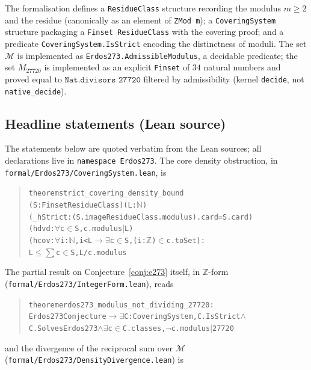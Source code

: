 \documentclass[11pt,a4paper]{article}
\theoremstyle{plain}
\theoremstyle{definition}
\theoremstyle{remark}
\begin{document}
The formalisation defines a \texttt{ResidueClass} structure
recording the modulus $m \geq 2$ and the residue (canonically as an
element of \texttt{ZMod m}); a \texttt{CoveringSystem} structure
packaging a \texttt{Finset ResidueClass} with the covering proof;
and a predicate \texttt{CoveringSystem.IsStrict} encoding the
distinctness of moduli. The set
$\mathcal{M}$ is implemented as \texttt{Erdos273.AdmissibleModulus},
a decidable predicate; the set $M_{27720}$ is implemented as an
explicit \texttt{Finset} of $34$ natural numbers and proved equal to
$\texttt{Nat.divisors 27720}$ filtered by admissibility (kernel
\texttt{decide}, not \texttt{native\_decide}).

\subsection*{Headline statements (Lean source)}

The statements below are quoted verbatim from the Lean sources; all
declarations live in \texttt{namespace Erdos273}. The core density
obstruction, in \texttt{formal/Erdos273/CoveringSystem.lean}, is

\begin{quote}
\begin{alltt}\small
theorem strict_covering_density_bound
    (S : Finset ResidueClass) (L : \(\mathbb{N}\))
    (_hStrict : (S.image ResidueClass.modulus).card = S.card)
    (hdvd : \(\forall\) c \(\in\) S, c.modulus \(\mid\) L)
    (hcov : \(\forall\) i : \(\mathbb{N}\), i < L \(\to\) \(\exists\) c \(\in\) S, (i : \(\mathbb{Z}\)) \(\in\) c.toSet) :
    L \(\leq\) \(\sum\) c \(\in\) S, L / c.modulus
\end{alltt}
\end{quote}

\noindent The partial result on Conjecture~\ref{conj:e273} itself, in
$\mathbb{Z}$-form (\texttt{formal/Erdos273/IntegerForm.lean}), reads

\begin{quote}
\begin{alltt}\small
theorem erdos273_modulus_not_dividing_27720 :
    Erdos273Conjecture \(\to\) \(\exists\) C : CoveringSystem, C.IsStrict \(\wedge\)
        C.SolvesErdos273 \(\wedge\) \(\exists\) c \(\in\) C.classes, \(\lnot\) c.modulus \(\mid\) 27720
\end{alltt}
\end{quote}

\noindent and the divergence of the reciprocal sum over $\mathcal{M}$
(\texttt{formal/Erdos273/DensityDivergence.lean}) is
\end{document}
